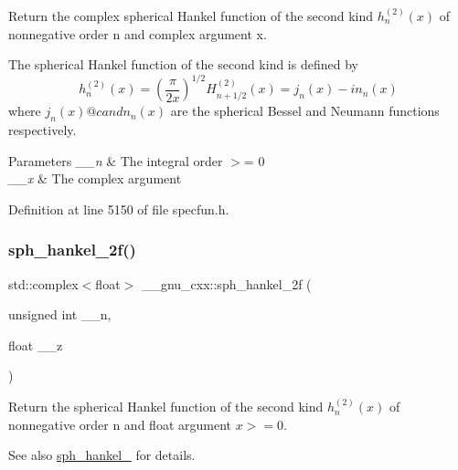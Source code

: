 Return the complex spherical Hankel function of the second kind $ h^{(2)}_n(x) $ of nonnegative order {\ttfamily n} and complex argument {\ttfamily x}.

The spherical Hankel function of the second kind is defined by \[ h^{(2)}_n(x) = \left(\frac{\pi}{2x} \right) ^{1/2} H^{(2)}_{n+1/2}(x) = j_n(x) - i n_n(x) \] where $ j_n(x) @c and n_n(x) $ are the spherical Bessel and Neumann functions respectively.


\begin{DoxyParams}{Parameters}
{\em \+\_\+\+\_\+n} & The integral order $>$= 0 \\
\hline
{\em \+\_\+\+\_\+x} & The complex argument \\
\hline
\end{DoxyParams}


Definition at line 5150 of file specfun.\+h.

\mbox{\label{group__mathsf__gnu_ga9496b81f94b8ba0162cf45df72be1e71}} 
\subsubsection{\texorpdfstring{sph\+\_\+hankel\+\_\+2f()}{sph\_hankel\_2f()}\hspace{0.1cm}{\footnotesize\ttfamily [1/2]}}
{\footnotesize\ttfamily std\+::complex$<$float$>$ \+\_\+\+\_\+gnu\+\_\+cxx\+::sph\+\_\+hankel\+\_\+2f (\begin{DoxyParamCaption}\item[{unsigned int}]{\+\_\+\+\_\+n,  }\item[{float}]{\+\_\+\+\_\+z }\end{DoxyParamCaption})\hspace{0.3cm}{\ttfamily [inline]}}

Return the spherical Hankel function of the second kind $ h^{(2)}_n(x)$ of nonnegative order n and {\ttfamily float} argument $ x >= 0 $.

\begin{DoxySeeAlso}{See also}
\hyperlink{group__mathsf__gnu_ga1ca08866a25e3637b04c57ff5a0c36a5}{sph\+\_\+hankel\+\_} for details. 
\end{DoxySeeAlso}


